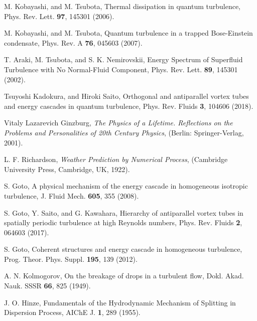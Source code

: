 \documentclass[12pt,a4paper]{jbook}
\begin{document}
\begin{thebibliography}{99}
		M. Kobayashi, and M. Tsubota,
		Thermal dissipation in quantum turbulence,
		Phys. Rev. Lett. \textbf{97}, 145301 (2006).

		M. Kobayashi, and M. Tsubota,
		Quantum turbulence in a trapped Bose-Einstein condensate,
		Phys. Rev. A \textbf{76}, 045603 (2007).

        T. Araki, M. Tsubota, and S. K. Nemirovskii,
        Energy Spectrum of Superfluid Turbulence with No Normal-Fluid Component,
        Phys. Rev. Lett. \textbf{89}, 145301 (2002).

		Tsuyoshi Kadokura, and Hiroki Saito,
		Orthogonal and antiparallel vortex tubes and energy cascades in quantum turbulence,
		Phys. Rev. Fluids {\bf 3}, 104606 (2018).

        Vitaly Lazarevich Ginzburg,
        {\it The Physics of a Lifetime.
        Reflections on the Problems and Personalities of 20th Century Physics}, (Berlin: Springer-Verlag, 2001).

		L. F. Richardson,
		{\it Weather Prediction by Numerical Process},
		(Cambridge University Press, Cambridge, UK, 1922).

		S. Goto,
		A physical mechanism of the energy cascade
		in homogeneous isotropic turbulence,
		J. Fluid Mech. \textbf{605}, 355 (2008).

		S. Goto, Y. Saito, and G. Kawahara,
		Hierarchy of antiparallel vortex tubes
		in spatially periodic turbulence at high Reynolds numbers,
		Phys. Rev. Fluids \textbf{2}, 064603 (2017).

		S. Goto,
		Coherent structures and energy cascade in homogeneous turbulence,
		Prog. Theor. Phys. Suppl. \textbf{195}, 139 (2012).

        A. N. Kolmogorov,
        On the breakage of drops in a turbulent flow,
        Dokl. Akad. Nauk. SSSR \textbf{66}, 825 (1949).

        J. O. Hinze,
        Fundamentals of the Hydrodynamic Mechanism of Splitting in Dispersion Process,
        AIChE J. \textbf{1}, 289 (1955).


\end{thebibliography}
\end{document}
